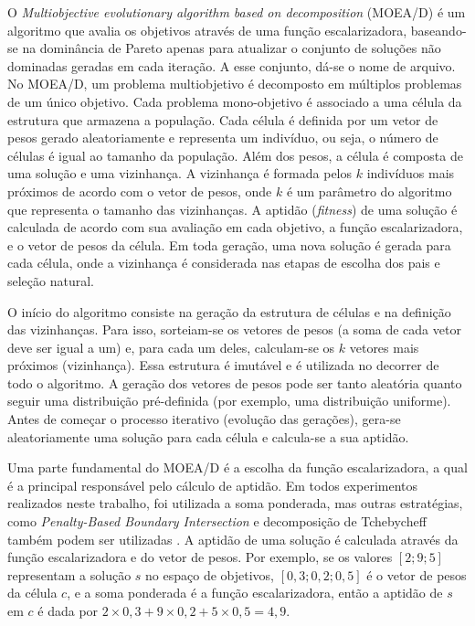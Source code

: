 O \textit{Multiobjective evolutionary algorithm based on decomposition} (MOEA/D) \cite{Zhang2007} é um algoritmo que avalia os objetivos através de uma função escalarizadora, baseando-se na dominância de Pareto apenas para atualizar o conjunto de soluções não dominadas geradas em cada iteração. A esse conjunto, dá-se o nome de arquivo. No MOEA/D, um problema multiobjetivo é decomposto em múltiplos problemas de um único objetivo. Cada problema mono-objetivo é associado a uma célula da estrutura que armazena a população. Cada célula é definida por um vetor de pesos gerado aleatoriamente e representa um indivíduo, ou seja, o número de células é igual ao tamanho da população. Além dos pesos, a célula é composta de uma solução e uma vizinhança. A vizinhança é formada pelos $k$ indivíduos mais próximos de acordo com o vetor de pesos, onde $k$ é um parâmetro do algoritmo que representa o tamanho das vizinhanças. A aptidão (\textit{fitness}) de uma solução é calculada de acordo com sua avaliação em cada objetivo, a função escalarizadora, e o vetor de pesos da célula. Em toda geração, uma nova solução é gerada para cada célula, onde a vizinhança é considerada nas etapas de escolha dos pais e seleção natural.

O início do algoritmo consiste na geração da estrutura de células e na definição das vizinhanças. Para isso, sorteiam-se os vetores de pesos (a soma de cada vetor deve ser igual a um) e, para cada um deles, calculam-se os $k$ vetores mais próximos (vizinhança). Essa estrutura é imutável e é utilizada no decorrer de todo o algoritmo. A geração dos vetores de pesos pode ser tanto aleatória quanto seguir uma distribuição pré-definida (por exemplo, uma distribuição uniforme). Antes de começar o processo iterativo (evolução das gerações), gera-se aleatoriamente uma solução para cada célula e calcula-se a sua aptidão. 

Uma parte fundamental do MOEA/D é a escolha da função escalarizadora, a qual é a principal responsável pelo cálculo de aptidão. Em todos experimentos realizados neste trabalho, foi utilizada a soma ponderada, mas outras estratégias, como \textit{Penalty-Based Boundary Intersection} e decomposição de Tchebycheff também podem ser utilizadas \cite{Zhang2007}. A aptidão de uma solução é calculada através da função escalarizadora e do vetor de pesos. Por exemplo, se os valores $[2; 9; 5]$ representam a solução $s$ no espaço de objetivos, $[0,3; 0,2; 0,5]$ é o vetor de pesos da célula $c$, e a soma ponderada é a função escalarizadora, então a aptidão de $s$ em $c$ é dada por $2 \times 0,3 + 9 \times 0,2 + 5 \times 0,5 = 4,9$.

